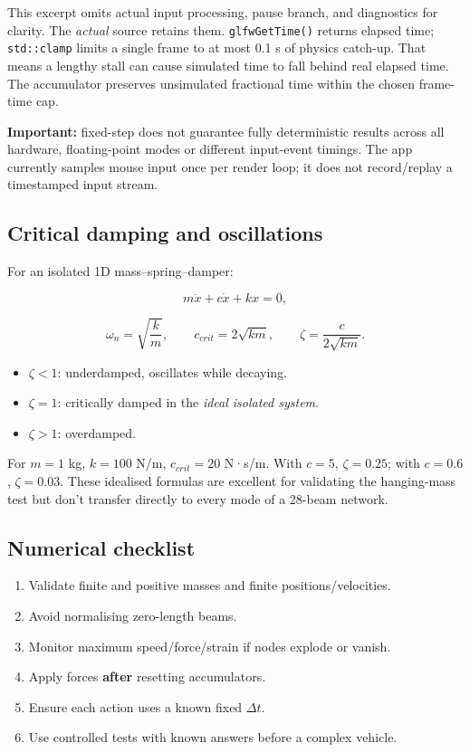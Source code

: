 \documentclass[
  10pt,
  a4paper,
]{article}
\providecommand{\tightlist}{%
  \setlength{\itemsep}{0pt}\setlength{\parskip}{0pt}}
\begin{document}
This excerpt omits actual input processing, pause branch, and
diagnostics for clarity. The \emph{actual} source retains them.
\texttt{glfwGetTime()} returns elapsed time; \texttt{std::clamp} limits
a single frame to at most 0.1 s of physics catch-up. That means a
lengthy stall can cause simulated time to fall behind real elapsed time.
The accumulator preserves unsimulated fractional time within the chosen
frame-time cap.

\textbf{Important:} fixed-step does not guarantee fully deterministic
results across all hardware, floating-point modes or different
input-event timings. The app currently samples mouse input once per
render loop; it does not record/replay a timestamped input stream.

\subsection{Critical damping and
oscillations}\label{critical-damping-and-oscillations}

For an isolated 1D mass--spring--damper:

\[m\ddot x+c\dot x+kx=0,\]

\[\omega_n=\sqrt{\frac{k}{m}},\qquad c_{crit}=2\sqrt{km},\qquad\zeta=\frac{c}{2\sqrt{km}}.\]

\begin{itemize}
\tightlist
\item
  \(\zeta<1\): underdamped, oscillates while decaying.
\item
  \(\zeta=1\): critically damped in the \emph{ideal isolated system}.
\item
  \(\zeta>1\): overdamped.
\end{itemize}

For \(m=1\) kg, \(k=100\) N/m, \(c_{crit}=20\) N·s/m. With \(c=5\),
\(\zeta=0.25\); with \(c=0.6\), \(\zeta=0.03\). These idealised formulas
are excellent for validating the hanging-mass test but don't transfer
directly to every mode of a 28-beam network.

\subsection{Numerical checklist}\label{numerical-checklist}

\begin{enumerate}
\def\labelenumi{\arabic{enumi}.}
\tightlist
\item
  Validate finite and positive masses and finite positions/velocities.
\item
  Avoid normalising zero-length beams.
\item
  Monitor maximum speed/force/strain if nodes explode or vanish.
\item
  Apply forces \textbf{after} resetting accumulators.
\item
  Ensure each action uses a known fixed \(\Delta t\).
\item
  Use controlled tests with known answers before a complex vehicle.
\end{enumerate}
\end{document}
